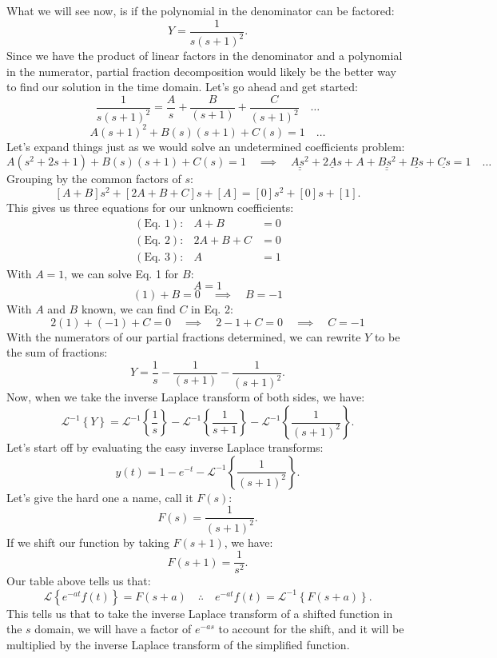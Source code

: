 \documentclass[a4paper,12pt]{article}
\begin{document}
What we will see now, is if the polynomial in the denominator can be factored:
$$ Y = \frac{1}{s(s+1)^2}. $$
Since we have the product of linear factors in the denominator and a polynomial in the numerator, partial fraction decomposition would likely be the better way to find our solution in the time domain. Let's go ahead and get started:
$$ \frac{1}{s(s+1)^2} = \frac{A}{s} + \frac{B}{(s+1)} + \frac{C}{(s+1)^2} \quad\ldots $$
$$ A(s+1)^2 + B(s)(s+1) + C(s)=1  \quad\ldots$$
Let's expand things just as we would solve an undetermined coefficients problem:
$$ A(s^2 + 2s + 1) + B(s)(s+1) + C(s) = 1 \quad\implies\quad \underline{\underline{As^2}} + \underline{2As} + A + \underline{\underline{Bs^2}} + \underline{Bs} + \underline{Cs} = 1 \quad\ldots $$
Grouping by the common factors of $s$:
$$ [A + B]s^2 + [2A + B + C]s + [A] = [0]s^2 + [0]s + [1]. $$
This gives us three equations for our unknown coefficients:
$$ \begin{matrix}
	(\text{Eq. 1}): & A + B & = 0 \\
	(\text{Eq. 2}): & 2A + B + C &  =0 \\
	(\text{Eq. 3}): & A & = 1 
\end{matrix} $$
With $A=1$, we can solve Eq. 1 for $B$:
$$ \boxed{A = 1} $$
$$ (1) + B = 0 \quad\implies\quad \boxed{B = -1} $$
With $A$ and $B$ known, we can find $C$ in Eq. 2:
$$ 2(1) + (-1) + C = 0 \quad\implies\quad 2-1 + C = 0 \quad\implies\quad \boxed{C=-1} $$
With the numerators of our partial fractions determined, we can rewrite $Y$ to be the sum of fractions:
$$ Y = \frac{1}{s} - \frac{1}{(s+1)} - \frac{1}{(s+1)^2}. $$
Now, when we take the inverse Laplace transform of both sides, we have:
$$ \mathcal{L}^{-1}\left\{Y\right\} = \mathcal{L}^{-1}\left\{\frac{1}{s}\right\} - \mathcal{L}^{-1}\left\{\frac{1}{s+1}\right\} - \mathcal{L}^{-1}\left\{\frac{1}{(s+1)^2}\right\}. $$
Let's start off by evaluating the easy inverse Laplace transforms:
$$ y(t) = 1 - e^{-t} - \mathcal{L}^{-1}\left\{\frac{1}{(s+1)^2}\right\}.$$
Let's give the hard one a name, call it $F(s)$:
$$ F(s) = \frac{1}{(s+1)^2}. $$
If we shift our function by taking $F(s+1)$, we have:
$$ F(s+1) = \frac{1}{s^2}. $$
Our table above tells us that:
$$ \mathcal{L}\left\{e^{-at}f(t)\right\} = F(s+a) \quad\therefore\quad e^{-at}f(t) = \mathcal{L}^{-1}\left\{F(s+a)\right\}. $$
This tells us that to take the inverse Laplace transform of a shifted function in the $s$ domain, we will have a factor of $e^{-as}$ to account for the shift, and it will be multiplied by the inverse Laplace transform of the simplified function.\\
\end{document}
